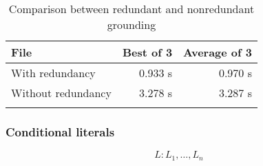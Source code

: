 \documentclass[
    digital,
    color,
    oneside,
    sansbold,
    lot,
    nolof
]{fithesis}
\begin{document}
{\setlength{\tabcolsep}{0.4em}%
\begin{table}
\begin{center}
    \begin{tabular}{l @{\hskip 1em} r r}\toprule{}%
        File               & Best of 3 & Average of 3 \\\midrule{}
        With redundancy    & 0.933 s   & 0.970 s \\
        Without redundancy & 3.278 s   & 3.287 s \\
        \bottomrule{}
    \end{tabular}
    \caption{Comparison between redundant and nonredundant grounding}%
    \label{grounding:redundancy}%
\end{center}\end{table}}\noindent

% 

\subsubsection{Conditional literals}

\begin{equation*}
    L : L_1, \dots, L_n
\end{equation*}
\end{document}
